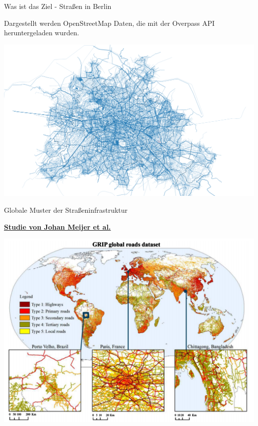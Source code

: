 \documentclass[ignorenonframetext,]{beamer}
\begin{document}
\begin{frame}{Was ist das Ziel - Straßen in Berlin}

Dargestellt werden OpenStreetMap Daten, die mit der Overpass API
heruntergeladen wurden.

\includegraphics{figure/streets_Berlin2.png}

\end{frame}

\begin{frame}{Globale Muster der Straßeninfrastruktur}

\begin{block}{\href{http://iopscience.iop.org/article/10.1088/1748-9326/aabd42/meta}{\textbf{Studie
von Johan Meijer et al.}}}

\includegraphics{figure/GRIP_globalroads.PNG}

\end{block}

\end{frame}
\end{document}
